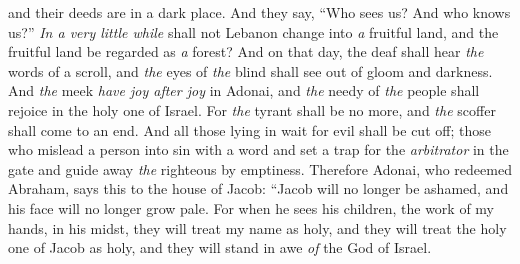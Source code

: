 \begin{biblechapter}
and their deeds are in a dark place. 
And they say, “Who sees us? 
And who knows us?”
 \textit{In a very little while} shall not Lebanon change into \textit{a} fruitful land, 
and the fruitful land be regarded as \textit{a} forest?
\verse And on that day, the deaf shall hear \textit{the} words of a scroll, 
and \textit{the} eyes of \textit{the} blind shall see out of gloom and darkness.
\verse And \textit{the} meek \textit{have joy after joy} in Adonai, 
and \textit{the} needy of \textit{the} people shall rejoice in the holy one of Israel.
\verse For \textit{the} tyrant shall be no more, 
and \textit{the} scoffer shall come to an end. 
And all those lying in wait for evil shall be cut off;
\verse those who mislead a person into sin with a word 
and set a trap for the \textit{arbitrator} in the gate 
and guide away \textit{the} righteous by emptiness.
\verse Therefore Adonai, who redeemed Abraham, says this to the house of Jacob:
\verse “Jacob will no longer be ashamed, 
and his face will no longer grow pale.
\verse For when he sees his children, 
the work of my hands, in his midst, 
they will treat my name as holy, 
and they will treat the holy one of Jacob as holy, 
and they will stand in awe \textit{of} the God of Israel.
\end{biblechapter}

